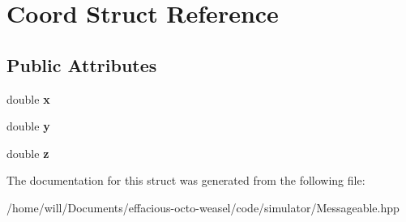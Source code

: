 \hypertarget{struct_coord}{}\section{Coord Struct Reference}
\label{struct_coord}
\subsection*{Public Attributes}
\begin{DoxyCompactItemize}
\item 
double {\bfseries x}\hypertarget{struct_coord_a0172a22ee75843a96e3a84ebc25f3de7}{}\label{struct_coord_a0172a22ee75843a96e3a84ebc25f3de7}

\item 
double {\bfseries y}\hypertarget{struct_coord_af6e543e0522076e717bae53102655b87}{}\label{struct_coord_af6e543e0522076e717bae53102655b87}

\item 
double {\bfseries z}\hypertarget{struct_coord_a2bf056108a79437171f18490afbdce2d}{}\label{struct_coord_a2bf056108a79437171f18490afbdce2d}

\end{DoxyCompactItemize}


The documentation for this struct was generated from the following file\+:\begin{DoxyCompactItemize}
\item 
/home/will/\+Documents/effacious-\/octo-\/weasel/code/simulator/Messageable.\+hpp\end{DoxyCompactItemize}
